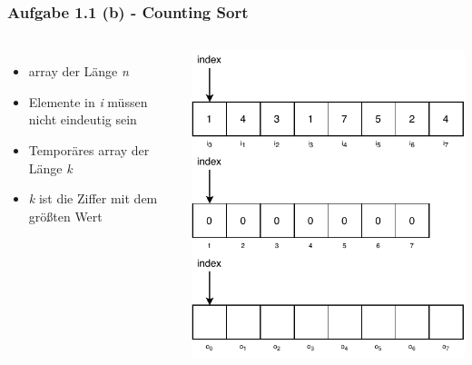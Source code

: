 \documentclass[aspectratio=169]{beamer}
\begin{document}
\begin{frame}
	\frametitle{Aufgabe 1.1 (b) - Counting Sort}
	\begin{columns}[c] %
	
	\begin{itemize}
		\item  array der Länge \emph{n}
		\item Elemente in \emph{i} müssen nicht eindeutig sein
		\item Temporäres array der Länge \emph{k}
		\item \emph{k} ist die Ziffer mit dem größten Wert
	\end{itemize}
	
	\includegraphics[scale=.7]{cs0.pdf}
	
	\end{columns}
	\end{frame}
\end{document}
